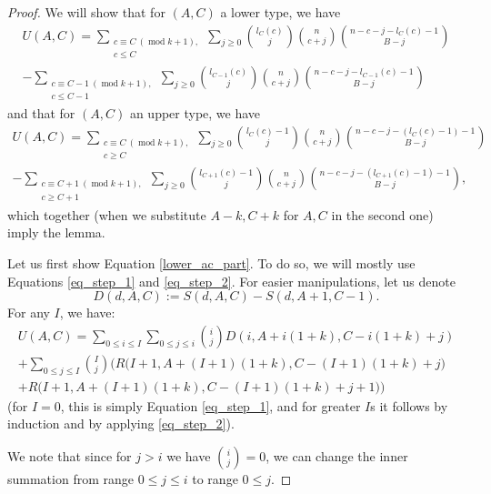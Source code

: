 \documentclass[11pt, reqno]{amsart}
\numberwithin{equation}{section}
\newcommand\modd{\operatorname{mod}}
\begin{document}
\begin{proof}
    We will show that for $(A, C)$ a lower type, we have
    \begin{multline}
    \label{lower_ac_part}
        U(A, C) = \sum_{\substack{c \equiv C \ (\modd k+1), \\ c \leqslant C}} \sum_{j \geqslant 0} \binom{l_C(c)}{j} \binom{n}{c+j} \binom{n-c-j-l_C(c)-1}{B-j}\\ - \sum_{\substack{c \equiv C-1 \ (\modd k+1), \\ c \leqslant C-1}} \sum_{j \geqslant 0} \binom{l_{C-1}(c)}{j} \binom{n}{c+j} \binom{n-c-j-l_{C-1}(c)-1}{B-j}
    \end{multline}
    and that for $(A, C)$ an upper type, we have
    \begin{multline}
    \label{upper_ac_part}
        U(A, C) = \sum_{\substack{c \equiv C \ (\modd k+1), \\ c \geqslant C}} \sum_{j \geqslant 0} \binom{l_{C}(c)-1}{j} \binom{n}{c+j} \binom{n-c-j-(l_{C}(c)-1)-1}{B-j}\\ - \sum_{\substack{c \equiv C+1 \ (\modd k+1), \\ c \geqslant C+1}} \sum_{j \geqslant 0} \binom{l_{C+1}(c)-1}{j} \binom{n}{c+j} \binom{n-c-j-(l_{C+1}(c)-1)-1}{B-j},
    \end{multline}
    which together (when we substitute $A-k, C+k$ for $A, C$ in the second one) imply the lemma.

    Let us first show Equation \ref{lower_ac_part}. To do so, we will mostly use Equations \ref{eq_step_1} and \ref{eq_step_2}. For easier manipulations, let us denote
    \begin{equation*}
        D(d, A, C) := S(d, A, C) - S(d, A+1, C-1).
    \end{equation*}
    For any $I$, we have:
    \begin{multline*}
        U(A, C) = \sum_{0 \leqslant i \leqslant I} \sum_{0 \leqslant j \leqslant i} \binom{i}{j} D(i, A+i(1+k), C-i(1+k)+j)\\
        + \sum_{0 \leqslant j \leqslant I} \binom{I}{j} \bigg( R\Big(I+1, A+(I+1)(1+k), C-(I+1)(1+k)+j\Big)\\ + R\Big(I+1, A+(I+1)(1+k), C-(I+1)(1+k)+j+1\Big) \bigg)
    \end{multline*}
    (for $I=0$, this is simply Equation \ref{eq_step_1}, and for greater $I$s it follows by induction and by applying \ref{eq_step_2}).

    We note that since for $j > i$ we have $\binom{i}{j}=0$, we can change the inner summation from range $0 \leqslant j \leqslant i$ to range $0 \leqslant j$.
    

\end{proof}
\end{document}
